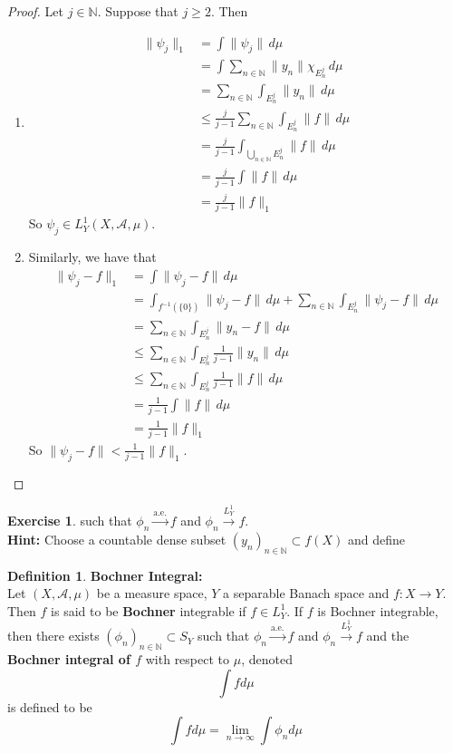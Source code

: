 \documentclass{book}
\theoremstyle{definition}
\newtheorem{defn}[definition]{Definition}
\newtheorem{ex}[definition]{Exercise}
\newcommand{\N}{\mathbb{N}}
\newcommand{\MA}{\mathcal{A}}
\newcommand{\ld}[1]{\label{defn:#1}}
\DeclareMathOperator*{\0}{\mbf{0}}
\DeclareMathOperator*{\1}{\mbf{1}}
\newcommand{\limn}{\lim \limits_{n \rightarrow \infty}}
\newcommand{\convt}[1]{\xrightarrow{\text{#1}}}
\newcommand{\conv}[1]{\xrightarrow{#1}}
\newcommand{\dmu}{\, d \mu}
\begin{document}
	\begin{proof}	
	Let $j \in \N$. 
	Suppose that $j \geq 2$. Then 
	\begin{enumerate}
		\item \begin{align*}
			\|\psi_j\|_1 
			& = \int \|\psi_j\| \dmu \\
			& = \int \sum_{n \in \N} \|y_n\| \chi_{E_n^j} \dmu \\
			& =  \sum_{n \in \N} \int_{E_n^j} \|y_n\| \dmu \\
			& \leq \frac{j}{j-1} \sum_{n \in \N} \int_{E_n^j} \|f\| \dmu \\
			& = \frac{j}{j-1} \int_{\bigcup\limits_{n \in \N} E_n^j} \|f\| \dmu \\
			& = \frac{j}{j-1} \int \|f\| \dmu \\
			& = \frac{j}{j-1} \|f\|_1
		\end{align*}
		So $\psi_j \in L^1_Y(X, \MA, \mu)$. 
		\item Similarly, we have that
		\begin{align*}
			\|\psi_j - f\|_1 
			& = \int \|\psi_j - f\| \dmu \\
			& = \int_{f^{-1}(\{0\})} \|\psi_j - f\| \dmu +  \sum_{n \in \N} \int_{E_n^j} \|\psi_j - f\| \dmu \\
			& = \sum_{n \in \N} \int_{E_n^j} \|y_n - f\| \dmu \\
			& \leq  \sum_{n \in \N} \int_{E_n^j}  \frac{1}{j - 1} \|y_n\| \dmu \\
			& \leq  \sum_{n \in \N} \int_{E_n^j}  \frac{1}{j - 1} \|f\| \dmu \\
			& =  \frac{1}{j - 1} \int \|f\| \dmu \\
			& =  \frac{1}{j - 1} \|f\|_1
		\end{align*}
		So $\|\psi_j - f\| < \frac{1}{j - 1} \|f\|_1$.
	\end{enumerate}
	\end{proof}	

	\begin{ex}
		such that $\phi_n \convt{a.e.} f$ and $\phi_n \conv{L_Y^1} f$.\\
		\textbf{Hint:} Choose a countable dense subset $(y_n)_{n \in \N} \subset f(X)$ and define 
	\end{ex}	
	
	\begin{defn} \ld{00000} \textbf{Bochner Integral:}\\
	Let $(X, \MA, \mu)$ be a measure space, $Y$ a separable Banach space and $f:X \rightarrow Y$. Then $f$ is said to be \textbf{Bochner} integrable if $f \in L^1_Y$. If $f$ is Bochner integrable, then there exists $(\phi_n)_{n \in \N} \subset S_Y$ such that $\phi_n \convt{a.e.} f$ and $\phi_n \conv{L_Y^1} f$ and the \textbf{Bochner integral of $f$} with respect to $\mu$, denoted $$\int f d\mu$$ is defined to be $$\int f d\mu = \limn \int \phi_n d\mu$$ 
	\end{defn}
	
\end{document}
